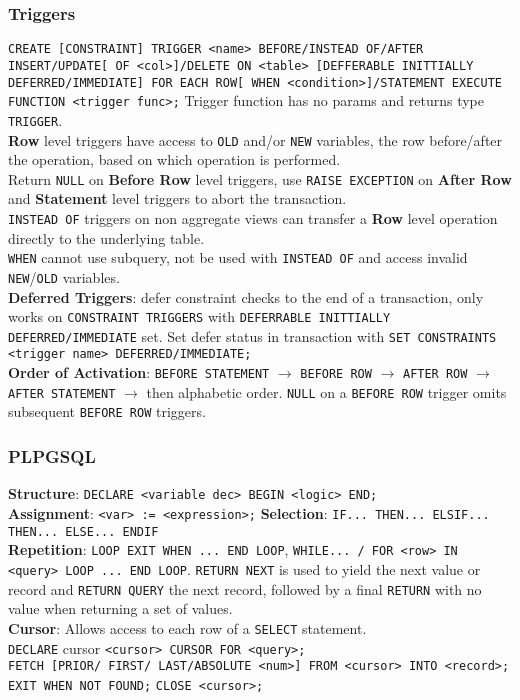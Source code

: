 \begin{multicols*}{3}
\subsubsection{Triggers}
\texttt{CREATE [CONSTRAINT] TRIGGER <name> BEFORE/INSTEAD OF/AFTER INSERT/UPDATE[ OF <col>]/DELETE ON <table> [DEFFERABLE INITTIALLY DEFERRED/IMMEDIATE] FOR EACH ROW[ WHEN <condition>]/STATEMENT EXECUTE FUNCTION <trigger func>;}
Trigger function has no params and returns type \texttt{TRIGGER}.\\
\textbf{Row} level triggers have access to \texttt{OLD} and/or \texttt{NEW} variables, the row before/after the operation, based on which operation is performed.\\
Return \texttt{NULL} on \textbf{Before Row} level triggers, use \texttt{RAISE EXCEPTION} on \textbf{After Row} and \textbf{Statement} level triggers to abort the transaction.\\
\texttt{INSTEAD OF} triggers on non aggregate views can transfer a \textbf{Row} level operation directly to the underlying table. \\
\texttt{WHEN} cannot use subquery, not be used with \texttt{INSTEAD OF} and access invalid \texttt{NEW}/\texttt{OLD} variables.\\
\textbf{Deferred Triggers}: defer constraint checks to the end of a transaction, only works on \texttt{CONSTRAINT TRIGGERS} with \texttt{DEFERRABLE INITTIALLY DEFERRED/IMMEDIATE} set. Set defer status in transaction with \texttt{SET CONSTRAINTS <trigger name> DEFERRED/IMMEDIATE;}\\
\textbf{Order of Activation}: \texttt{BEFORE STATEMENT} $\rightarrow$ \texttt{BEFORE ROW} $\rightarrow$ \texttt{AFTER ROW} $\rightarrow$ \texttt{AFTER STATEMENT} $\rightarrow$ then alphabetic order. \texttt{NULL} on a \texttt{BEFORE ROW} trigger omits subsequent \texttt{BEFORE ROW} triggers.\\

\subsubsection{PLPGSQL}
\textbf{Structure}: \texttt{DECLARE <variable dec> BEGIN <logic> END;} \\
\textbf{Assignment}: \texttt{<var> := <expression>;}
\textbf{Selection}: \texttt{IF... THEN... ELSIF... THEN... ELSE... ENDIF}\\
\textbf{Repetition}: \texttt{LOOP EXIT WHEN ... END LOOP}, \texttt{WHILE... / FOR <row> IN <query> LOOP ... END LOOP}. \texttt{RETURN NEXT} is used to yield the next value or record and \texttt{RETURN QUERY} the next record, followed by a final \texttt{RETURN} with no value when returning a set of values.\\
\textbf{Cursor}: Allows access to each row of a \texttt{SELECT} statement.\\
\texttt{DECLARE} cursor \texttt{<cursor> CURSOR FOR <query>;}\\
\texttt{FETCH [PRIOR/ FIRST/ LAST/ABSOLUTE <num>] FROM <cursor> INTO <record>;}\\
\texttt{EXIT WHEN NOT FOUND;} \texttt{CLOSE <cursor>;}\\


\end{multicols*}
